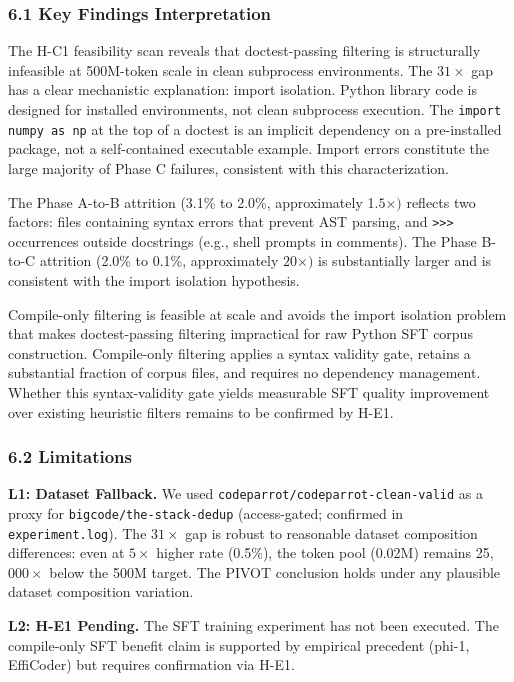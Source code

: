 
\subsubsection{6.1 Key Findings Interpretation}

The H-C1 feasibility scan reveals that doctest-passing filtering is structurally infeasible
at 500M-token scale in clean subprocess environments. The $31\times$ gap has a clear mechanistic
explanation: import isolation. Python library code is designed for installed environments,
not clean subprocess execution. The \texttt{import numpy as np} at the top of a doctest is an
implicit dependency on a pre-installed package, not a self-contained executable example.
Import errors constitute the large majority of Phase C failures, consistent with this
characterization.

The Phase A-to-B attrition (3.1\% to 2.0\%, approximately 1.$5\times )$ reflects two factors:
files containing syntax errors that prevent AST parsing, and \texttt{>>>} occurrences outside
docstrings (e.g., shell prompts in comments). The Phase B-to-C attrition (2.0\% to 0.1\%,
approximately $20\times )$ is substantially larger and is consistent with the import isolation
hypothesis.

Compile-only filtering is feasible at scale and avoids the import isolation problem that
makes doctest-passing filtering impractical for raw Python SFT corpus construction. Compile-only
filtering applies a syntax validity gate, retains a substantial fraction of corpus files, and
requires no dependency management. Whether this syntax-validity gate yields measurable SFT
quality improvement over existing heuristic filters remains to be confirmed by H-E1.

\subsubsection{6.2 Limitations}

\textbf{L1: Dataset Fallback.} We used \texttt{codeparrot/codeparrot-clean-valid} as a proxy for
\texttt{bigcode/the-stack-dedup} (access-gated; confirmed in \texttt{experiment.log}). The $31\times$ gap is
robust to reasonable dataset composition differences: even at $5\times$ higher rate (0.5\%), the
token pool (0.02M) remains 25,$000\times$ below the 500M target. The PIVOT conclusion holds under
any plausible dataset composition variation.

\textbf{L2: H-E1 Pending.} The SFT training experiment has not been executed. The compile-only SFT
benefit claim is supported by empirical precedent (phi-1, EffiCoder) but requires confirmation
via H-E1.


